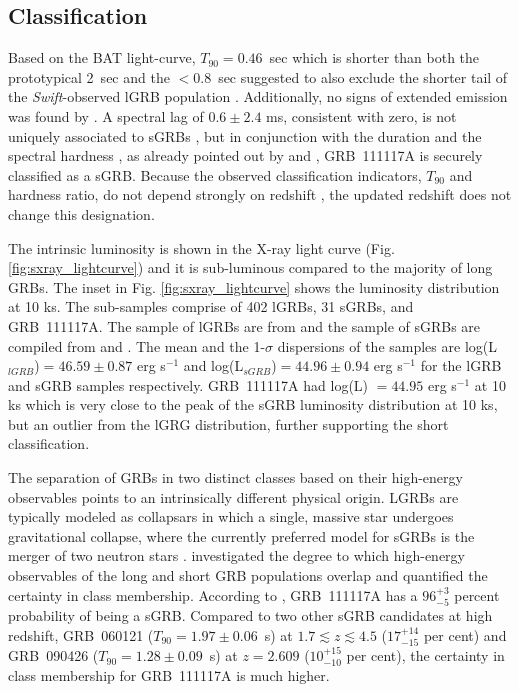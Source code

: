 \documentclass{aa}    %
\begin{document}
\subsection{Classification} \label{classification}

Based on the BAT light-curve, $T_{90}=0.46$~sec which is shorter than both the
prototypical 2~sec \citep{Kouveliotou1993} and the $<0.8$~sec suggested to also
exclude the shorter tail of the \textit{Swift}-observed lGRB population
\citep{Bromberg2012a}. Additionally, no signs of extended emission was found by
\citep{Sakamoto2013}. A spectral lag of $0.6 \pm2.4$ ms, consistent with zero,
is not uniquely associated to sGRBs \citep{Bernardini2015}, but in conjunction
with the duration and the spectral hardness \citep{Sakamoto2011}, as already pointed out
by \citet{Margutti2012} and \citet{Sakamoto2013}, GRB~111117A is securely
classified as a sGRB. Because the observed classification indicators, $T_{90}$
and hardness ratio, do not depend strongly on redshift \citep{Littlejohns2013a},
the updated redshift does not change this designation. 

The intrinsic luminosity is shown in the X-ray light curve (Fig.
\ref{fig:sxray_lightcurve}) and it is sub-luminous compared to the majority of
long GRBs. The inset in Fig. \ref{fig:sxray_lightcurve} shows the luminosity
distribution at 10 ks. The sub-samples comprise of 402 lGRBs, 31 sGRBs, and
GRB~111117A. The sample of lGRBs are from \citet{Evans2007, Evans2009} and the
sample of sGRBs are compiled from \citet{Kann2011, Berger2014} and
\citet{DAvanzo2014a}. The mean and the 1-$\sigma$ dispersions of the samples are
log(L$_{lGRB}$)$ = 46.59 \pm 0.87$ erg s$^{-1}$ and log(L$_{sGRB}$)$  = 44.96
\pm 0.94$ erg s$^{-1}$ for the lGRB and sGRB samples respectively. GRB~111117A
had log(L) $= 44.95$ erg s$^{-1}$ at 10 ks which is very close to the peak of
the sGRB luminosity distribution at 10 ks, but an outlier from the lGRG
distribution, further supporting the short classification.

The separation of GRBs in two distinct classes based on their high-energy
observables points to an intrinsically different physical origin. LGRBs are
typically modeled as collapsars \citep{MacFadyen1999} in which a single, massive
star undergoes gravitational collapse, where the currently preferred model for
sGRBs is the merger of two neutron stars \citep{Eichler1989, Nakar2007}.
\citet{Bromberg2013} investigated the degree to which high-energy observables of
the long and short GRB populations overlap and quantified the certainty in class
membership. According to \citet{Bromberg2013}, GRB~111117A has a $96_{-5}^{+3}$
percent probability of being a sGRB. Compared to two other sGRB candidates
at high redshift, GRB~060121 ($T_{90}=1.97 \pm 0.06$~s)
\citep{DeUgartePostigo2006, Levan2006} at $1.7 \lesssim z \lesssim 4.5$
($17_{-15}^{+14}$ per cent) and GRB~090426 ($T_{90}=1.28 \pm 0.09$~s)
\citep{Antonelli2009, Levesque2010, Thone2011} at $z = 2.609$ ($10_{-10}^{+15}$
per cent), the certainty in class membership for GRB~111117A is much higher.
\end{document}
